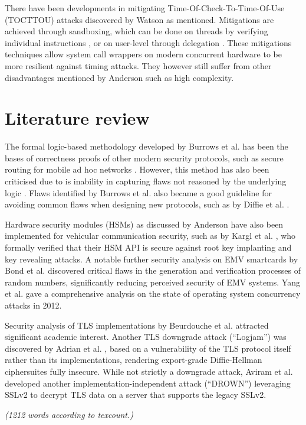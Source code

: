 \documentclass[11pt]{article}
\begin{document}
There have been developments in mitigating Time-Of-Check-To-Time-Of-Use (TOCTTOU) attacks discovered by Watson \cite{watson2007exploiting} as mentioned. Mitigations are achieved through sandboxing, which can be done on threads by verifying individual instructions \cite{payer2011fine}, or on user-level through delegation \cite{xu2012aurasium}. These mitigations techniques allow system call wrappers on modern concurrent hardware to be more resilient against timing attacks. They however still suffer from other disadvantages mentioned by Anderson \cite[18.3]{anderson2010security} such as high complexity.

\section{Literature review}

The formal logic-based methodology developed by Burrows et al. \cite{burrows1989logic} has been the bases of correctness proofs of other modern security protocols, such as secure routing for mobile ad hoc networks \cite{papadimitratos2002secure}. However, this method has also been criticised due to is inability in capturing flaws not reasoned by the underlying logic \cite{bellare1993entity}. Flaws identified by Burrows et al. also became a good guideline for avoiding common flaws when designing new protocols, such as by Diffie et al. \cite{diffie1992authentication}.

Hardware security modules (HSMs) as discussed by Anderson \cite{anderson2010security} have also been implemented for vehicular communication security, such as by Kargl et al. \cite{kargl2008secure}, who formally verified that their HSM API is secure against root key implanting and key revealing attacks. A notable further security analysis on EMV smartcards by Bond et al. \cite{bond2014chip} discovered critical flaws in the generation and verification processes of random numbers, significantly reducing perceived security of EMV systems. Yang et al. \cite{yang2012concurrency} gave a comprehensive analysis on the state of operating system concurrency attacks in 2012. 

Security analysis of TLS implementations by Beurdouche et al. \cite{beurdouche2015messy} attracted significant academic interest. Another TLS downgrade attack (``Logjam'') was discovered by Adrian et al. \cite{adrian2015imperfect}, based on a vulnerability of the TLS protocol itself rather than its implementations, rendering export-grade Diffie-Hellman ciphersuites fully insecure. While not strictly a downgrade attack, Aviram et al. \cite{aviram2016drown} developed another implementation-independent attack (``DROWN'') leveraging SSLv2 to decrypt TLS data on a server that supports the legacy SSLv2.

\emph{(1212 words according to texcount.)}


\footnotesize{}
\end{document}

